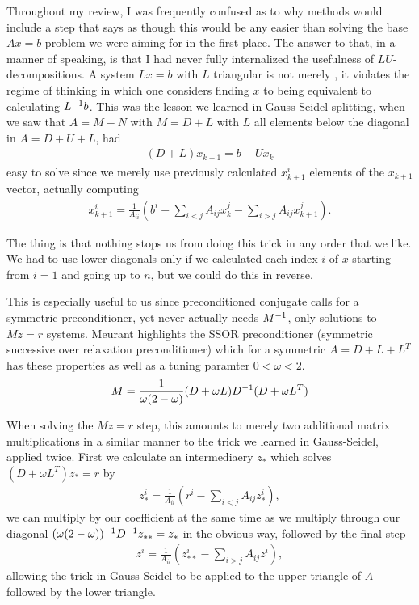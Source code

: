 \documentclass[11pt]{article}
\begin{document}
Throughout my review, I was frequently confused as to why methods would include a step that says  as though this would be any easier than solving the base $Ax = b$ problem we were aiming for in the first place. The answer to that, in a manner of speaking, is that I had never fully internalized the usefulness of $LU$-decompositions. A system $Lx = b$ with $L$ triangular is not merely , it violates the regime of thinking in which one considers finding $x$ to being equivalent to calculating $L^{-1} b$. This was the lesson we learned in Gauss-Seidel splitting, when we saw that $A = M - N$ with $M = D + L$ with $L$ all elements below the diagonal in $A = D + U + L$, had \begin{gather*}
(D + L) x_{k+1} = b - Ux_k 
\end{gather*}
easy to solve since we merely use previously calculated $x_{k+1}^i$ elements of the $x_{k+1}$ vector, actually computing \begin{gather*}
x_{k+1}^i = \frac{1}{A_{ii}} \left( b^i - \sum_{i < j} A_{ij} x_k^j - \sum_{i > j} A_{ij} x_{k+1}^j \right).
\end{gather*}

The thing is that nothing stops us from doing this trick in any order that we like. We had to use lower diagonals only if we calculated each index $i$ of $x$ starting from $i=1$ and going up to $n$, but we could do this in reverse.

This is especially useful to us since preconditioned conjugate calls for a symmetric preconditioner, yet never actually needs $M^{-1}$, only solutions to $Mz = r$ systems. Meurant highlights the SSOR preconditioner (symmetric successive over relaxation preconditioner) which for a symmetric $A = D + L + L^T$ has these properties as well as a tuning paramter $0 < \omega < 2$. \begin{gather*}
M = \frac{1}{\omega(2 - \omega)} (D + \omega L)D^{-1} (D + \omega L^T)
\end{gather*}

When solving the $Mz = r$ step, this amounts to merely two additional matrix multiplications in a similar manner to the trick we learned in Gauss-Seidel, applied twice. First we calculate an intermediaery $z_*$ which solves $(D + \omega L^T)z_* = r$ by \begin{gather*}
z_*^i = \frac{1}{A_{ii}} \left( r^i - \sum_{i < j} A_{ij} z_*^i \right),
\end{gather*}
we can multiply by our coefficient at the same time as we multiply through our diagonal $(\omega(2-\omega))^{-1} D^{-1} z_{**} = z_*$ in the obvious way, followed by the final step \begin{gather*}
z^i = \frac{1}{A_{ii}} \left( z_{**}^i - \sum_{i > j} A_{ij} z^i \right),
\end{gather*}
allowing the trick in Gauss-Seidel to be applied to the upper triangle of $A$ followed by the lower triangle.
\end{document}
